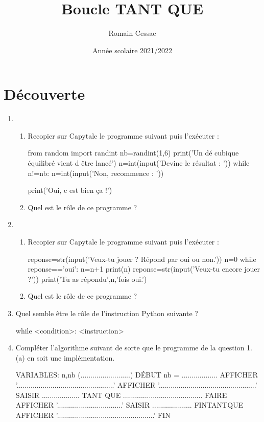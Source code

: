 \documentclass[activite]{mathsRC}
\author{Romain Cessac}
\title{Boucle TANT QUE}
\date{Année scolaire 2021/2022}
\begin{document}
\maketitle
\section*{Découverte}
\begin{enumerate}
\item
\begin{enumerate}
\item
Recopier sur Capytale  le programme suivant puis l'exécuter :

\begin{python*}
from random import randint
nb=randint(1,6)
print('Un dé cubique équilibré vient d être lancé')
n=int(input('Devine le résultat : '))
while n!=nb:
	n=int(input('Non, recommence : '))
	
print('Oui, c est bien ça !')
\end{python*}
\item
Quel est le rôle de ce programme ?
\end{enumerate}

\item
\begin{enumerate}
\item
Recopier sur Capytale le programme suivant puis l'exécuter :

\begin{python*}
reponse=str(input('Veux-tu jouer ? Répond par oui ou non.'))
n=0
while reponse=='oui':
    n=n+1
    print(n)
    reponse=str(input('Veux-tu encore jouer ?'))
print('Tu as répondu',n,'fois oui.')
\end{python*}
\item
Quel est le rôle de ce programme ?
\end{enumerate}

\item
Quel semble être le rôle de l'instruction Python suivante ?

\begin{python*}
while <condition>:
	<instruction>
\end{python*}

\item
Compléter l'algorithme suivant de sorte que le programme de la question 1.(a) en soit une implémentation.

\begin{algorithme}
VARIABLES: n,nb (.........................)
DÉBUT
nb = ..................
AFFICHER '.................................................'
AFFICHER '.................................................'
SAISIR ...................
TANT QUE ........................................ FAIRE
	AFFICHER '.................................'
	SAISIR ....................
FINTANTQUE
AFFICHER '.................................................'
FIN
\end{algorithme}
\end{enumerate}
\end{document}
